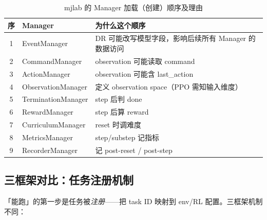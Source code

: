 \begin{table}[ht]
\centering
\caption{mjlab 的 Manager 加载（创建）顺序及理由}
\label{tab:rlmc-mgr-loadorder}
\small
\begin{tabular}{@{}cll@{}}
\toprule
序 & Manager & 为什么这个顺序 \\
\midrule
1 & EventManager & DR 可能改写模型字段，影响后续所有 Manager 的数据访问 \\
2 & CommandManager & observation 可能读取 command \\
3 & ActionManager & observation 可能含 last\_action \\
4 & ObservationManager & 定义 observation space（PPO 需知输入维度） \\
5 & TerminationManager & step 后判 done \\
6 & RewardManager & step 后算 reward \\
7 & CurriculumManager & reset 时调难度 \\
8 & MetricsManager & step/substep 记指标 \\
9 & RecorderManager & 记 post-reset / post-step \\
\bottomrule
\end{tabular}
\end{table}


\subsection{三框架对比：任务注册机制}

「能跑」的第一步是任务被\emph{注册}——把 task ID 映射到 env/RL 配置。三框架机制不同：

